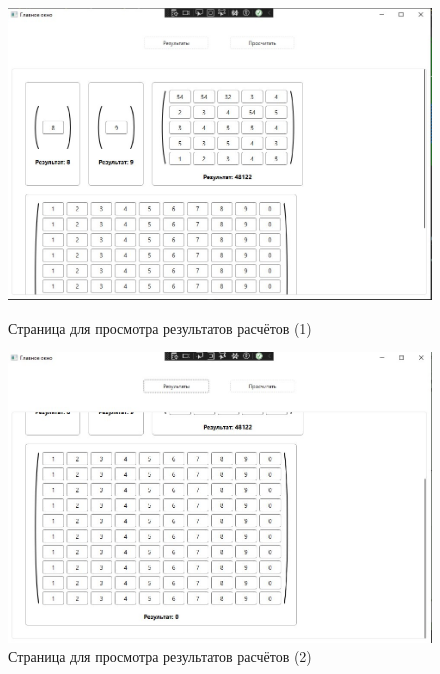 \documentclass[12pt,a4paper]{scrartcl}
\begin{document}
\begin{figure}[H]
\centering
\begin{minipage}{0.48\textwidth}
    \centering
    \includegraphics[width=\textwidth]{./assets/pic2.jpeg}
    \caption{Страница для просмотра результатов расчётов (1)}
    \label{fig:pic2}
\end{minipage}
\hfill
\begin{minipage}{0.48\textwidth}
    \centering
    \includegraphics[width=\textwidth]{./assets/pic3.jpeg}
    \caption{Страница для просмотра результатов расчётов (2)}
    \label{fig:pic3}
\end{minipage}
\end{figure}
\end{document}
